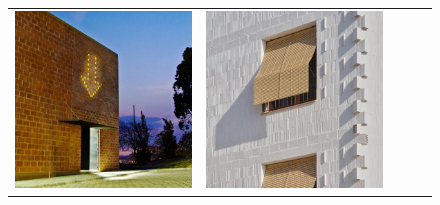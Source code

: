 \begin{figure}[H]
{\begin{tabular}{@{}ccccc@{}}
      \includegraphics[width=\linewidth]{Images/LoRAs/3D-effect/Training_images/8.jpg} &
      \includegraphics[width=\linewidth]{Images/LoRAs/3D-effect/Training_images/9.jpg} &

\end{tabular}}
\end{figure}
